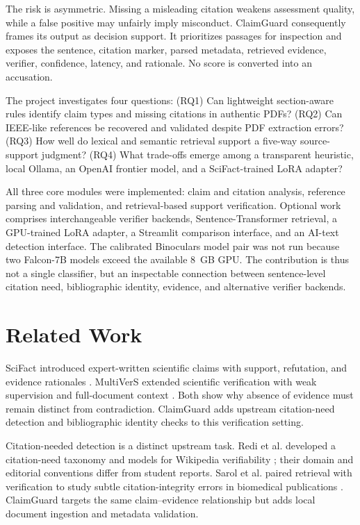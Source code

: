 \documentclass[12pt,toc=bib,toc=listof]{scrartcl}
\begin{document}
The risk is asymmetric. Missing a misleading citation weakens assessment quality, while a false positive may unfairly imply misconduct. ClaimGuard consequently frames its output as decision support. It prioritizes passages for inspection and exposes the sentence, citation marker, parsed metadata, retrieved evidence, verifier, confidence, latency, and rationale. No score is converted into an accusation.

The project investigates four questions: (RQ1) Can lightweight section-aware rules identify claim types and missing citations in authentic PDFs? (RQ2) Can IEEE-like references be recovered and validated despite PDF extraction errors? (RQ3) How well do lexical and semantic retrieval support a five-way source-support judgment? (RQ4) What trade-offs emerge among a transparent heuristic, local Ollama, an OpenAI frontier model, and a SciFact-trained LoRA adapter?

All three core modules were implemented: claim and citation analysis, reference parsing and validation, and retrieval-based support verification. Optional work comprises interchangeable verifier backends, Sentence-Transformer retrieval, a GPU-trained LoRA adapter, a Streamlit comparison interface, and an AI-text detection interface. The calibrated Binoculars model pair was not run because two Falcon-7B models exceed the available 8~GB GPU. The contribution is thus not a single classifier, but an inspectable connection between sentence-level citation need, bibliographic identity, evidence, and alternative verifier backends.

\section{Related Work}

SciFact introduced expert-written scientific claims with support, refutation, and evidence rationales \cite{wadden2020}. MultiVerS extended scientific verification with weak supervision and full-document context \cite{wadden2022}. Both show why absence of evidence must remain distinct from contradiction. ClaimGuard adds upstream citation-need detection and bibliographic identity checks to this verification setting.

Citation-needed detection is a distinct upstream task. Redi et al. developed a citation-need taxonomy and models for Wikipedia verifiability \cite{redi2019}; their domain and editorial conventions differ from student reports. Sarol et al. paired retrieval with verification to study subtle citation-integrity errors in biomedical publications \cite{sarol2024}. ClaimGuard targets the same claim--evidence relationship but adds local document ingestion and metadata validation.
\end{document}
